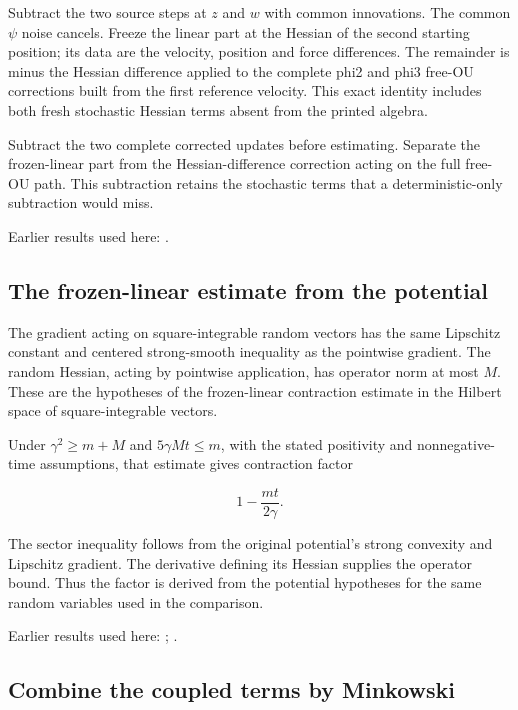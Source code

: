 \documentclass[11pt,a4paper]{report}
\begin{document}
Subtract the two source steps at \(z\) and \(w\) with common innovations. The common \(\psi\) noise cancels. Freeze the linear part at the Hessian of the second starting position; its data are the velocity, position and force differences. The remainder is minus the Hessian difference applied to the complete phi2 and phi3 free-OU corrections built from the first reference velocity. This exact identity includes both fresh stochastic Hessian terms absent from the printed algebra.



Subtract the two complete corrected updates before estimating. Separate the frozen-linear part from the Hessian-difference correction acting on the full free-OU path. This subtraction retains the stochastic terms that a deterministic-only subtraction would miss.



Earlier results used here: \cite[Section~3.8.17]{LangevinLean2026ULASC}.
\subsection{\texorpdfstring{The frozen-linear estimate from the potential}{The frozen-linear estimate from the potential}}
\label{report-step-KineticLangevin-SecondOrderComparison-lean-5}


The gradient acting on square-integrable random vectors has the same Lipschitz constant and centered strong-smooth inequality as the pointwise gradient. The random Hessian, acting by pointwise application, has operator norm at most \(M\). These are the hypotheses of the frozen-linear contraction estimate in the Hilbert space of square-integrable vectors.



Under \(\gamma^2\ge m+M\) and \(5\gamma Mt\le m\), with the stated positivity and nonnegative-time assumptions, that estimate gives contraction factor

\[1-\frac{mt}{2\gamma}.\]

The sector inequality follows from the original potential's strong convexity and Lipschitz gradient. The derivative defining its Hessian supplies the operator bound. Thus the factor is derived from the potential hypotheses for the same random variables used in the comparison.



Earlier results used here: \cite[Section~3.13.2]{LangevinLean2026ULASC}; \cite[Section~3.13.5]{LangevinLean2026ULASC}.
\subsection{\texorpdfstring{Combine the coupled terms by Minkowski}{Combine the coupled terms by Minkowski}}
\label{report-step-KineticLangevin-SecondOrderComparison-lean-6}
\end{document}
